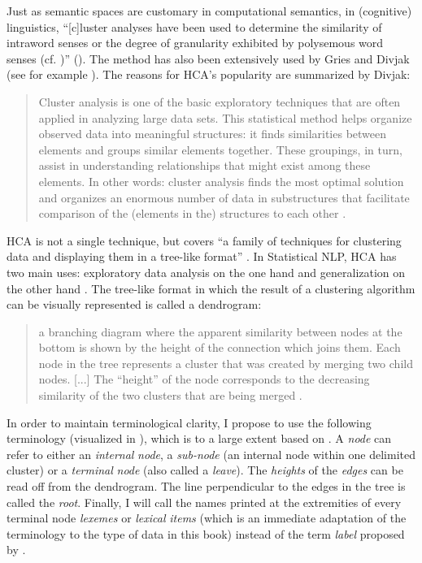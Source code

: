 Just as semantic spaces are customary in computational semantics, in (cognitive) linguistics, “[c]luster analyses have been used to determine the similarity of intraword senses or the degree of granularity exhibited by polysemous word senses (cf. \citealt{steinberg_empirical_1971,sandra_network_1995,putz_prepositional_1996})” (\citealt[81]{Gries2006b}). The method has also been extensively used by Gries and Divjak (see for example \citealt{divjak_ways_2006, divjak_structuring_2010,glynn_cluster_2014,divjak_ways_2006, evans_behavioral_2009,Gries2006,evans_behavioral_2009,gries_behavioral_2010,deshors_case_2014}). The reasons for HCA’s popularity are summarized by Divjak:

\begin{quote}
Cluster analysis is one of the basic exploratory techniques that are often applied in analyzing large data sets. This statistical method helps organize observed data into meaningful structures: it finds similarities between elements and groups similar elements together. These groupings, in turn, assist in understanding relationships that might exist among these elements. In other words: cluster analysis finds the most optimal solution and organizes an enormous number of data in substructures that facilitate comparison of the (elements in the) structures to each other \citep[129--130]{Divjak2010}.
\end{quote}

HCA is not a single technique, but covers “a family of techniques for clustering data and displaying them in a tree-like format” \citep[138]{baayen_analyzing_2008}. In Statistical NLP, HCA has two main uses: exploratory data analysis on the one hand and generalization on the other hand \citep[497]{manning_foundations_1999}. The tree-like format in which the result of a clustering algorithm can be visually represented is called a dendrogram:

\begin{quote}
a branching diagram where the apparent similarity between nodes at the bottom is shown by the height of the connection which joins them. Each node in the tree represents a cluster that was created by merging two child nodes. [...] The “height” of the node corresponds to the decreasing similarity of the two clusters that are being merged \citep[495]{manning_foundations_1999}.
\end{quote}

In order to maintain terminological clarity, I propose to use the following terminology (visualized in ), which is to a large extent based on \citet[89]{everitt_cluster_2011}. A \textit{node} can refer to either an \textit{internal} \textit{node}, a \textit{sub-node} (an internal node within one delimited cluster) or a \textit{terminal} \textit{node} (also called a \textit{leave}). The \textit{heights} of the \textit{edges} can be read off from the dendrogram. The line perpendicular to the edges in the tree is called the \textit{root}. Finally, I will call the names printed at the extremities of every terminal node \textit{lexemes} or \textit{lexical} \textit{items} (which is an immediate adaptation of the terminology to the type of data in this book) instead of the term \textit{label} proposed by \citet{everitt_cluster_2011}. 

